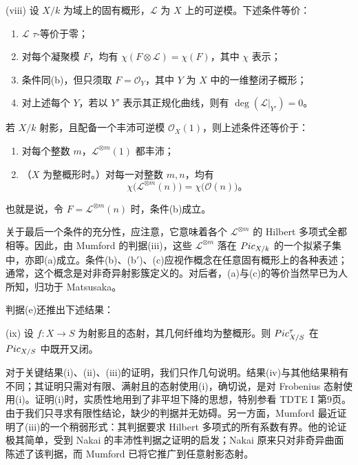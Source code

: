 \begin{statement}{(viii)}
设 $X/k$ 为域上的固有概形，$\mathcal L$ 为 $X$ 上的可逆模。下述条件等价：
\begin{enumerate}[label=\alph*.]
\item $\mathcal L$ $\tau$-等价于零；
\item 对每个凝聚模 $F$，均有 $\chi(F\otimes\mathcal L)=\chi(F)$，其中 $\chi$ 表示；
\item[\textnormal{b$'$.}] 条件同(b)，但只须取 $F=\mathcal O_Y$，其中 $Y$ 为 $X$ 中的一维整闭子概形；
\item[\textnormal{c.}] 对上述每个 $Y$，若以 $Y'$ 表示其正规化曲线，则有 $\deg(\mathcal L|_{Y'})=0$。
\end{enumerate}
若 $X/k$ 射影，且配备一个丰沛可逆模 $\mathcal O_X(1)$，则上述条件还等价于：
\begin{enumerate}[label=\alph*.,start=4]
\item 对每个整数 $m$，$\mathcal L^{\otimes m}(1)$ 都丰沛；
\item （$X$ 为整概形时。）对每一对整数 $m,n$，均有
\[
\chi\bigl(\mathcal L^{\otimes m}(n)\bigr)=\chi\bigl(\mathcal O(n)\bigr)。
\]
\end{enumerate}
\end{statement}
也就是说，令 $F=\mathcal L^{\otimes m}(n)$ 时，条件(b)成立。

关于最后一个条件的充分性，应注意，它意味着各个 $\mathcal L^{\otimes m}$ 的 Hilbert 多项式全都相等。因此，由 Mumford 的判据(iii)，这些 $\mathcal L^{\otimes m}$ 落在 $Pic_{X/k}$ 的一个拟紧子集中，亦即(a)成立。条件(b)、(b$'$)、(c)应视作概念在任意固有概形上的各种表述；通常，这个概念是对非奇异射影簇定义的。对后者，(a)与(c)的等价当然早已为人所知，归功于 Matsusaka。

判据(e)还推出下述结果：
\begin{statement}{(ix)}
设 $f\colon X\to S$ 为射影且的态射，其几何纤维均为整概形。则 $Pic^\tau_{X/S}$ 在 $Pic_{X/S}$ 中既开又闭。
\end{statement}

对于关键结果(i)、(ii)、(iii)的证明，我们只作几句说明。结果(iv)与其他结果稍有不同；其证明只需对有限、满射且的态射使用(i)，确切说，是对 Frobenius 态射使用(i)。证明(i)时，实质性地用到了非平坦下降的思想，特别参看 TDTE I 第9页。由于我们只寻求有限性结论，缺少的判据并无妨碍。另一方面，Mumford 最近证明了(iii)的一个稍弱形式：其判据要求 Hilbert 多项式的所有系数有界。他的论证极其简单，受到 Nakai 的丰沛性判据之证明的启发；Nakai 原来只对非奇异曲面陈述了该判据，而 Mumford 已将它推广到任意射影态射。

